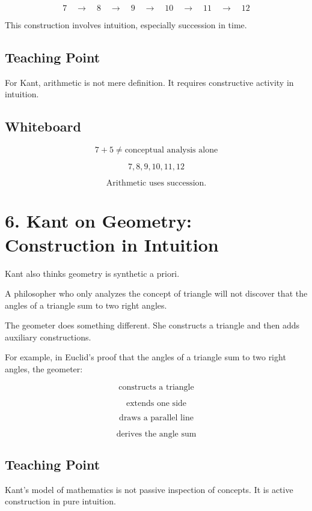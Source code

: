 \documentclass[11pt]{article}
\begin{document}
\[
7
\quad \rightarrow \quad
8
\quad \rightarrow \quad
9
\quad \rightarrow \quad
10
\quad \rightarrow \quad
11
\quad \rightarrow \quad
12
\]

This construction involves intuition, especially succession in time.

\subsection*{Teaching Point}

For Kant, arithmetic is not mere definition. It requires constructive activity in intuition.

\subsection*{Whiteboard}

\[
7+5
\neq
\text{conceptual analysis alone}
\]

\[
7,8,9,10,11,12
\]

\[
\text{Arithmetic uses succession.}
\]

\section*{6. Kant on Geometry: Construction in Intuition}

Kant also thinks geometry is synthetic a priori.

A philosopher who only analyzes the concept of triangle will not discover that the angles
of a triangle sum to two right angles.

The geometer does something different. She constructs a triangle and then adds auxiliary
constructions.

For example, in Euclid's proof that the angles of a triangle sum to two right angles, the
geometer:

\[
\text{constructs a triangle}
\]

\[
\text{extends one side}
\]

\[
\text{draws a parallel line}
\]

\[
\text{derives the angle sum}
\]

\subsection*{Teaching Point}

Kant's model of mathematics is not passive inspection of concepts. It is active
construction in pure intuition.
\end{document}
